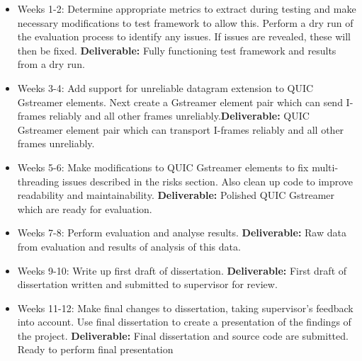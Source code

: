 \documentclass[11pt]{article}
\begin{document}
\begin{itemize}
    \item
      Weeks 1-2: 
      Determine appropriate metrics to extract during testing and make necessary modifications to test framework to allow this.  
      Perform a dry run of the evaluation process to identify any issues. If issues are revealed, these will then be fixed. \textbf{Deliverable:}
      Fully functioning test framework and results from a dry run.
    \item
      Weeks 3-4: 
      Add support for unreliable datagram extension to QUIC Gstreamer elements. Next create a Gstreamer element pair which can send I-frames reliably and all other frames unreliably.\textbf{Deliverable:} QUIC Gstreamer element pair
      which can transport I-frames reliably and all other frames unreliably.
    \item
      Weeks 5-6: Make modifications to QUIC Gstreamer elements to fix multi-threading issues described in the risks section. Also clean up code to improve readability and maintainability.
      \textbf{Deliverable:} Polished QUIC Gstreamer which are ready for evaluation.
    \item
      Weeks 7-8: Perform evaluation and analyse results.
      \textbf{Deliverable:} Raw data from evaluation and results of analysis of this data.
    \item
      Weeks 9-10: Write up first draft of dissertation. \textbf{Deliverable:}  First draft of dissertation written and submitted to supervisor for review.
    \item
      Weeks 11-12: Make final changes to dissertation, taking supervisor's feedback into account. Use final dissertation to create a presentation of the findings of the project.
      \textbf{Deliverable:} Final dissertation and source code are submitted. Ready to perform final presentation
\end{itemize}
    
\end{document}
